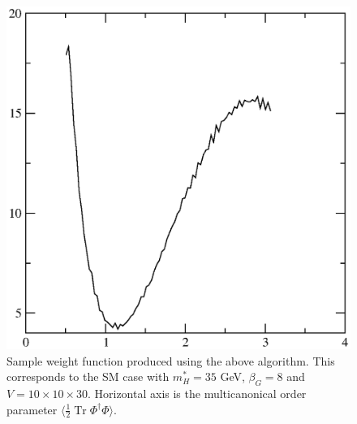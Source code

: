\documentclass[11pt,a4paper]{article}
\newcommand\Tr{\operatorname{Tr}}
\begin{document}
\begin{figure}[h]
\centering
	\includegraphics[scale=0.5]{weight}
	\caption{Sample weight function produced using the above algorithm. This corresponds to the SM case with $m_H^* = 35$ GeV, $\beta_G = 8$ and $V = 10\times 10\times 30$. Horizontal axis is the multicanonical order parameter $\langle\frac12 \Tr\Phi^\dagger\Phi\rangle$. }
	\label{fig:weight}
\end{figure}
\end{document}
